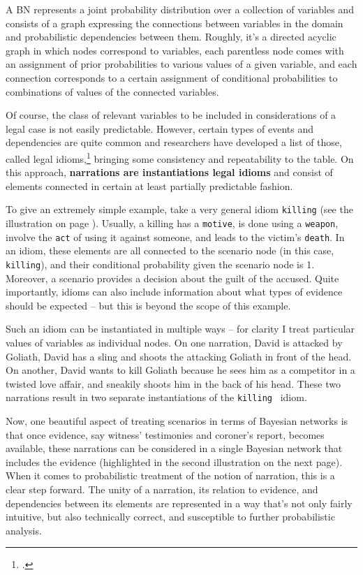 \documentclass[11pt, a4paper]{article}
\begin{document}
A BN represents a joint probability distribution over a collection of variables and consists of a graph expressing the connections between variables in the domain and probabilistic dependencies between them. Roughly, it's a directed acyclic graph in which nodes correspond to variables,  each parentless node comes with an assignment of prior probabilities to various values of a given variable, and each connection corresponds to a certain assignment of conditional probabilities to combinations of values of the connected variables.  


Of course, the class of relevant variables to be included in considerations of a legal case is not easily predictable. However, certain types of events and dependencies are quite common and researchers have developed a list of those, called legal idioms,\footcite{fenton2013general} bringing  some consistency and repeatability to the table. On this approach, \textbf{narrations are instantiations legal idioms} and consist of elements connected in  certain at least partially predictable fashion.

 To give an extremely simple example, take a very general  idiom  \verb|killing|  (see the illustration on page \pageref{obrazki}). Usually, a killing has a \verb|motive|, is done using a \verb|weapon|, involve the \verb|act| of using it against someone, and leads to the victim's \verb|death|. In an idiom, these elements are all connected to the scenario node (in this case, \verb|killing|), and their conditional probability given the scenario node is 1. Moreover, a scenario provides a decision about the guilt of the accused. Quite importantly, idioms can also include information about what types of evidence should be expected -- but this is beyond the scope of this example. 

 Such an idiom can be instantiated in multiple ways --  for clarity I treat particular values of variables as individual nodes. On one narration,  David is attacked by Goliath, David has a sling and shoots the attacking Goliath in front of  the head.
On another, David wants to  kill Goliath because he sees him as a competitor in a twisted love affair, and sneakily shoots him in the back of his head. These two narrations result in two separate instantiations of the \verb|killing| \, idiom. 


Now, one beautiful aspect of treating scenarios in terms of Bayesian networks is that once evidence, say witness' testimonies and coroner's report, becomes available, these narrations can be considered in a single Bayesian network that includes the evidence (highlighted in the second illustration on the next page). When it comes to probabilistic treatment of the notion of narration, this is a clear step forward.  The unity of a narration, its relation to evidence, and  dependencies between its elements are represented in a way that's not only fairly intuitive, but also technically correct,  and susceptible to further probabilistic analysis. 
\end{document}
